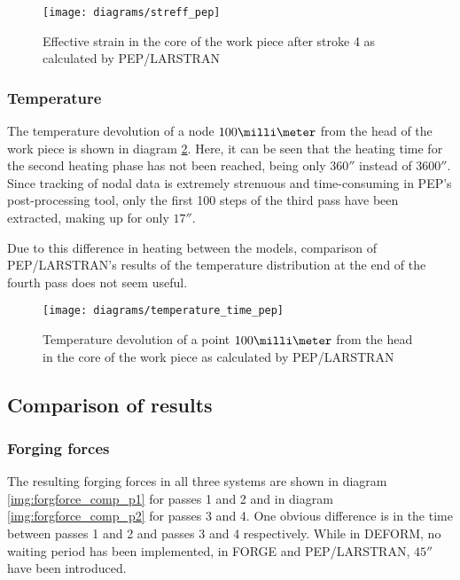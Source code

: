\begin{figure}[tb]
  \centering
  \texttt{[image: diagrams/streff\_pep]}
  \caption{Effective strain in the core of the work piece after stroke 4 as calculated by PEP/LARSTRAN}
  \label{img:streff_pep}
\end{figure}

\subsubsection{Temperature}

The temperature devolution of a node $100\milli\meter$ from the head of the work piece is shown in diagram \ref{img:temp_time_pep}. Here, it can be seen that the heating time for the second heating phase has not been reached, being only $360\second$ instead of $3600\second$. Since tracking of nodal data is extremely strenuous and time-consuming in PEP's post-processing tool, only the first 100 steps of the third pass have been extracted, making up for only $17\second$.

Due to this difference in heating between the models, comparison of PEP/LARSTRAN's results of the temperature distribution at the end of the fourth pass does not seem useful.

\begin{figure}[tb]
  \centering
  \texttt{[image: diagrams/temperature\_time\_pep]}
  \caption{Temperature devolution of a point $100\milli\meter$ from the head in the core of the work piece as calculated by PEP/LARSTRAN}
  \label{img:temp_time_pep}
\end{figure}


\subsection{Comparison of results}

\subsubsection{Forging forces}

The resulting forging forces in all three systems are shown in diagram \ref{img:forgforce_comp_p1} for passes 1 and 2 and in diagram \ref{img:forgforce_comp_p2} for passes 3 and 4. One obvious difference is in the time between passes 1 and 2 and passes 3 and 4 respectively. While in DEFORM, no waiting period has been implemented, in FORGE and PEP/LARSTRAN, $45\second$ have been introduced.

